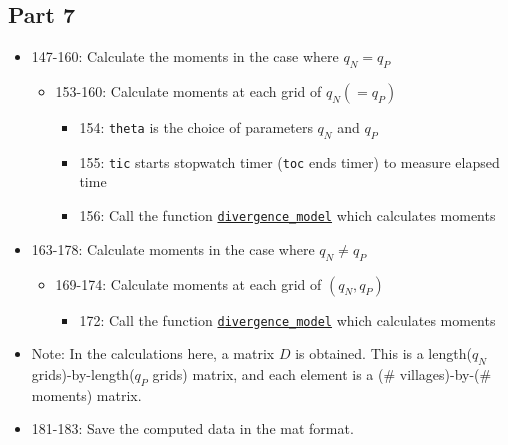 \documentclass[10pt,letterpaper]{article}
\begin{document}
\begin{itemize}
\subsection*{Part 7}
\begin{itemize}
  \item 147-160: Calculate the moments in the case where $q_N = q_P$
    \begin{itemize}
      \item 153-160: Calculate moments at each grid of $q_N (= q_P)$
        \begin{itemize}
          \item 154: \texttt{theta} is the choice of parameters $q_N$ and $q_P$
          \item 155: \texttt{tic} starts stopwatch timer (\texttt{toc} ends timer) to measure elapsed time
          \item 156: Call the function \hyperref[divergence_model]{\texttt{divergence\_model}} which calculates moments
        \end{itemize}
    \end{itemize}
  \item 163-178: Calculate moments in the case where $q_N \ne q_P$
    \begin{itemize}
      \item 169-174: Calculate moments at each grid of $(q_N, q_P)$
        \begin{itemize}
          \item 172: Call the function \hyperref[divergence_model]{\texttt{divergence\_model}} which calculates moments
        \end{itemize}
    \end{itemize}
  \item Note: In the calculations here, a matrix $D$ is obtained.
    This is a length($q_N$ grids)-by-length($q_P$ grids) matrix, and each element is a (\# villages)-by-(\# moments) matrix.
  \item 181-183: Save the computed data in the mat format.
\end{itemize}


\end{itemize}
\end{document}
